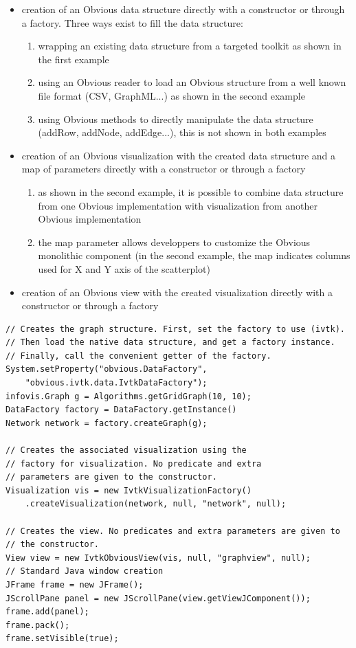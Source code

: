 \begin{itemize}
 \item creation of an Obvious data structure directly with a constructor or through a factory. Three ways exist to fill the data structure:
 \begin{enumerate}
  \item wrapping an existing data structure from a targeted toolkit as shown in the first example
  \item using an Obvious reader to load an Obvious structure from a well known file format (CSV, GraphML...) as shown in the second example
  \item using Obvious methods to directly manipulate the data structure (addRow, addNode, addEdge...), this is not shown in both examples 
 \end{enumerate}
 \item creation of an Obvious visualization with the created data structure and a map of parameters directly with a constructor or through a factory
 \begin{enumerate}
  \item as shown in the second example, it is possible to combine data structure from one Obvious implementation with visualization from another Obvious implementation
  \item the map parameter allows developpers to customize the Obvious monolithic component (in the second example, the map indicates columns used for X and Y axis of the scatterplot)
 \end{enumerate}
 \item creation of an Obvious view with the created visualization directly with a constructor or through a factory
\end{itemize} 

\begin{lstlisting}
// Creates the graph structure. First, set the factory to use (ivtk).
// Then load the native data structure, and get a factory instance.
// Finally, call the convenient getter of the factory.
System.setProperty("obvious.DataFactory",
    "obvious.ivtk.data.IvtkDataFactory");
infovis.Graph g = Algorithms.getGridGraph(10, 10);
DataFactory factory = DataFactory.getInstance()
Network network = factory.createGraph(g);

// Creates the associated visualization using the
// factory for visualization. No predicate and extra
// parameters are given to the constructor.
Visualization vis = new IvtkVisualizationFactory()
    .createVisualization(network, null, "network", null);

// Creates the view. No predicates and extra parameters are given to
// the constructor.
View view = new IvtkObviousView(vis, null, "graphview", null);
// Standard Java window creation
JFrame frame = new JFrame();
JScrollPane panel = new JScrollPane(view.getViewJComponent());
frame.add(panel);
frame.pack();
frame.setVisible(true);
\end{lstlisting}

